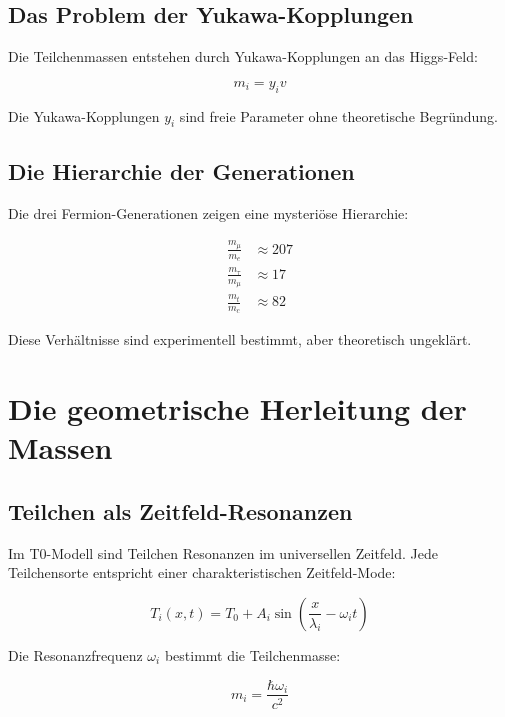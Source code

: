 \documentclass[12pt,a4paper]{report}
\begin{document}
	\subsection{Das Problem der Yukawa-Kopplungen}
	
	Die Teilchenmassen entstehen durch Yukawa-Kopplungen an das Higgs-Feld:
	
	\begin{equation}
		m_i = y_i v
	\end{equation}
	
	Die Yukawa-Kopplungen $y_i$ sind freie Parameter ohne theoretische Begründung.
	
	\subsection{Die Hierarchie der Generationen}
	
	Die drei Fermion-Generationen zeigen eine mysteriöse Hierarchie:
	
	\begin{align}
		\frac{m_\mu}{m_e} &\approx 207 \\
		\frac{m_\tau}{m_\mu} &\approx 17 \\
		\frac{m_t}{m_c} &\approx 82
	\end{align}
	
	Diese Verhältnisse sind experimentell bestimmt, aber theoretisch ungeklärt.
	
	\section{Die geometrische Herleitung der Massen}
	
	\subsection{Teilchen als Zeitfeld-Resonanzen}
	
	Im T0-Modell sind Teilchen Resonanzen im universellen Zeitfeld. Jede Teilchensorte entspricht einer charakteristischen Zeitfeld-Mode:
	
	\begin{equation}
		T_i(x,t) = T_0 + A_i \sin\left(\frac{x}{\lambda_i} - \omega_i t\right)
	\end{equation}
	
	Die Resonanzfrequenz $\omega_i$ bestimmt die Teilchenmasse:
	
	\begin{equation}
		m_i = \frac{\hbar\omega_i}{c^2}
	\end{equation}
	
\end{document}
